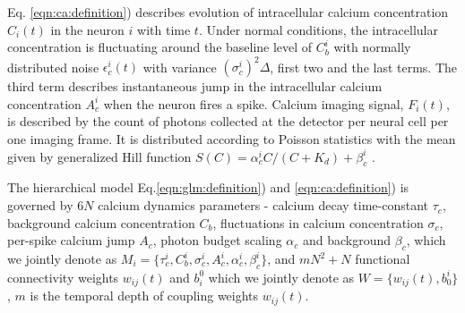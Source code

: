 Eq. \eqref{eqn:ca:definition}) describes evolution of intracellular calcium concentration $C_i(t)$ in the neuron $i$ with time $t$. Under normal conditions, the intracellular concentration is fluctuating around the baseline level of $C^i_b$ with normally distributed noise $\epsilon^i_c(t)$ with variance $(\sigma^i_c)^2\Delta$, first two and the last terms.  The third term describes instantaneous jump in the intracellular calcium concentration $A^i_c$ when the neuron fires a spike.  Calcium imaging signal, $F_i(t)$, is described by the count of photons collected at the detector per neural cell per one imaging frame. It is distributed according to Poisson statistics with the mean given by generalized Hill function $S(C)=\alpha^i_c C/(C+K_d) + \beta^i_c$ \cite{Yasuda2004}.

The hierarchical model Eq.\eqref{eqn:glm:definition}) and \eqref{eqn:ca:definition}) is governed by $6N$ calcium dynamics parameters - calcium decay time-constant $\tau_c$, background calcium concentration $C_{b}$, fluctuations in calcium concentration $\sigma_c$, per-spike calcium jump $A_c$, photon budget scaling $\alpha_c$ and background $\beta_c$, which we jointly denote as $M_i=\{\tau^i_c, C^i_{b}, \sigma^i_c, A^i_c, \alpha^i_c, \beta^i_c\}$, and $m N^2 + N$ functional connectivity weights $w_{ij}(t)$ and $b^0_i$ which we jointly denote as $W=\{w_{ij}(t), b_0^i\}$, $m$ is the temporal depth of coupling weights $w_{ij}(t)$.
